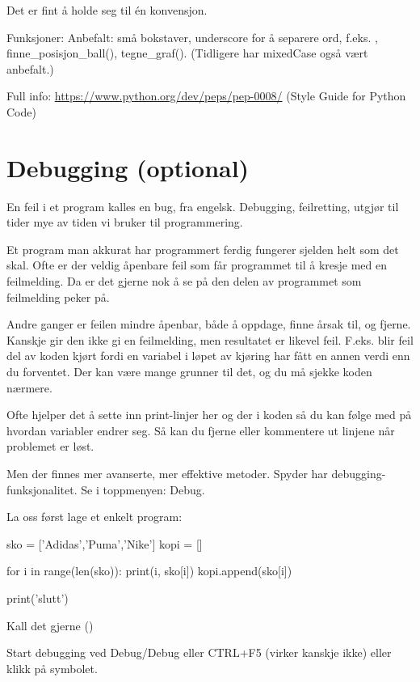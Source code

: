 Det er fint å holde seg til én konvensjon. 

Funksjoner:
Anbefalt: små bokstaver, underscore for å separere ord, f.eks. , finne\_{}posisjon\_{}ball(), tegne\_{}graf(). (Tidligere har mixedCase også vært anbefalt.) 

Full info: \url{https://www.python.org/dev/peps/pep-0008/} (Style Guide for Python Code) 

\section{Debugging (optional)}

En feil i et program kalles en bug, fra engelsk. Debugging, feilretting, utgjør til tider mye av tiden vi bruker til programmering. 

Et program man akkurat har programmert ferdig fungerer sjelden helt som det skal. Ofte er der veldig åpenbare feil som får programmet til å kresje med en feilmelding. Da er det gjerne nok å se på den delen av programmet som feilmelding peker på. 

Andre ganger er feilen mindre åpenbar, både å oppdage, finne årsak til, og fjerne. Kanskje gir den ikke gi en feilmelding, men resultatet er likevel feil. F.eks. blir feil del av koden kjørt fordi en variabel i løpet av kjøring har fått en annen verdi enn du forventet. Der kan være mange grunner til det, og du må sjekke koden nærmere. 

Ofte hjelper det å sette inn print-linjer her og der i koden så du kan følge med på hvordan variabler endrer seg. Så kan du fjerne eller kommentere ut linjene når problemet er løst.

Men der finnes mer avanserte, mer effektive metoder. Spyder har debugging-funksjonalitet.
Se i toppmenyen: Debug.

La oss først lage et enkelt program:

\begin{usncodebox}
sko = ['Adidas','Puma','Nike']
kopi = []

for i in range(len(sko)): 
    print(i, sko[i])
    kopi.append(sko[i])

print('slutt')
\end{usncodebox}

Kall det gjerne  (\usnsubmenusep{})

Start debugging ved Debug/Debug eller CTRL+F5 (virker kanskje ikke) eller klikk på symbolet.


